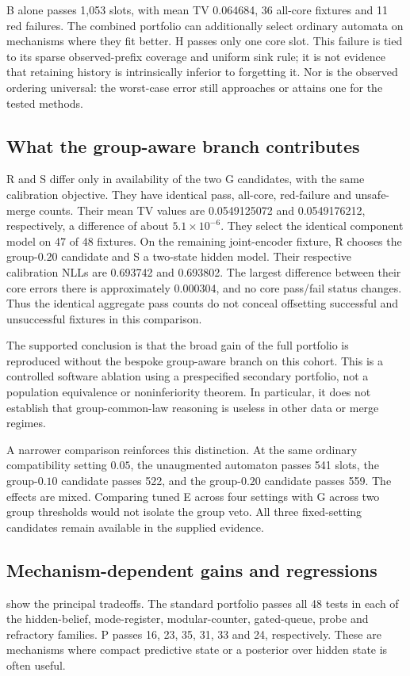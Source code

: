 

B alone passes 1,053 slots, with mean TV 0.064684, 36 all-core fixtures and 11 red failures. The combined portfolio can additionally select ordinary automata on mechanisms where they fit better. H passes only one core slot. This failure is tied to its sparse observed-prefix coverage and uniform sink rule; it is not evidence that retaining history is intrinsically inferior to forgetting it. Nor is the observed ordering universal: the worst-case error still approaches or attains one for the tested methods.

\subsection{What the group-aware branch contributes}\label{p3:c11}
R and S differ only in availability of the two G candidates, with the same calibration objective. They have identical pass, all-core, red-failure and unsafe-merge counts. Their mean TV values are 0.0549125072 and 0.0549176212, respectively, a difference of about $5.1\times10^{-6}$. They select the identical component model on 47 of 48 fixtures. On the remaining joint-encoder fixture, R chooses the group-$0.20$ candidate and S a two-state hidden model. Their respective calibration NLLs are 0.693742 and 0.693802. The largest difference between their core errors there is approximately 0.000304, and no core pass/fail status changes. Thus the identical aggregate pass counts do not conceal offsetting successful and unsuccessful fixtures in this comparison.

The supported conclusion is that the broad gain of the full portfolio is reproduced without the bespoke group-aware branch on this cohort. This is a controlled software ablation using a prespecified secondary portfolio, not a population equivalence or noninferiority theorem. In particular, it does not establish that group-common-law reasoning is useless in other data or merge regimes.

A narrower comparison reinforces this distinction. At the same ordinary compatibility setting $0.05$, the unaugmented automaton passes 541 slots, the group-$0.10$ candidate passes 522, and the group-$0.20$ candidate passes 559. The effects are mixed. Comparing tuned E across four settings with G across two group thresholds would not isolate the group veto. All three fixed-setting candidates remain available in the supplied evidence.

\subsection{Mechanism-dependent gains and regressions}\label{p3:c14}
 show the principal tradeoffs. The standard portfolio passes all 48 tests in each of the hidden-belief, mode-register, modular-counter, gated-queue, probe and refractory families. P passes 16, 23, 35, 31, 33 and 24, respectively. These are mechanisms where compact predictive state or a posterior over hidden state is often useful.

